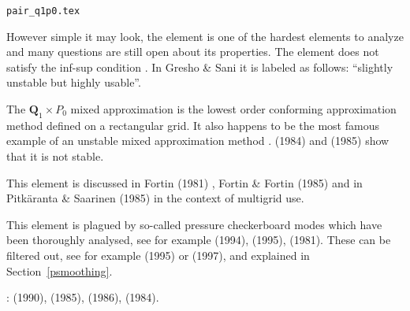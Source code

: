 \begin{flushright} {\tiny {\color{gray} \tt pair\_q1p0.tex}} \end{flushright}


\begin{minipage}{0.48\textwidth}
\begin{center}

\end{center}
\end{minipage}
\begin{minipage}{0.48\textwidth}
\begin{center}

\end{center}
\end{minipage}

However simple it may look, the  element is 
one of the hardest elements to analyze and many questions are still open about its properties. 
The element does not satisfy the inf-sup condition \cite[p211]{hugh}. 
In Gresho \& Sani \cite{grsa} it is labeled as follows: {\color{darkgray}
``slightly unstable but highly usable''}. 

The ${\bm Q}_1 \times P_0$ mixed approximation is the lowest order conforming approximation 
method defined on a rectangular grid. It also happens to be the most famous example 
of an unstable mixed approximation method \cite[p235]{elsw}.
\textcite{boni84} (1984) and \textcite{boni85} (1985) show that it is not stable.

This element is discussed in Fortin (1981) \cite{fort81}, Fortin \& Fortin (1985) \cite{fofo85} 
and in Pitk\"aranta \& Saarinen (1985) \cite{pisa85} in the context of multigrid use.

This element is plagued by so-called pressure checkerboard modes which
have been thoroughly analysed, see for example \textcite{grsi94} (1994), 
\textcite{chpc95} (1995), \textcite{sagl81a,sagl81b} (1981).
These can be filtered out, see for example \textcite{chpc95} (1995) or \textcite{legs79} (1997), 
and explained in Section~\ref{psmoothing}.

\Literature: \textcite{fobo90} (1990), \cite{grle85} (1985),
\textcite{leru86} (1986), \textcite{odja84} (1984).

